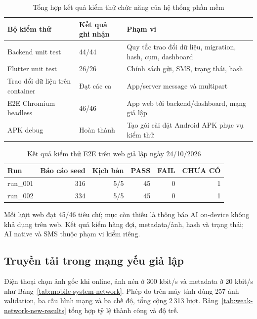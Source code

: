 \begin{table}[H]\centering\small
\caption{Tổng hợp kết quả kiểm thử chức năng của hệ thống phần mềm}
\label{tab:historical-tests}
\begin{tabularx}{\textwidth}{P{.32\textwidth}P{.16\textwidth}X}
\toprule Bộ kiểm thử & Kết quả ghi nhận & Phạm vi \\\midrule
Backend unit test & 44/44 & Quy tắc trao đổi dữ liệu, migration, hash, cụm, dashboard \\
Flutter unit test & 26/26 & Chính sách gửi, SMS, trạng thái, hash \\
Trao đổi dữ liệu trên container & Đạt các ca & App/server message và multipart \\
E2E Chromium headless & 46/46 & App web tới backend/dashboard, mạng giả lập \\
APK debug & Hoàn thành & Tạo gói cài đặt Android APK phục vụ kiểm thử \\
\bottomrule\end{tabularx}
\end{table}

\begin{table}[H]\centering\small
\caption{Kết quả kiểm thử E2E trên web giả lập ngày 24/10/2026}\label{tab:web-e2e-results}
\begin{tabular}{lrrrrr}
\toprule Run & Báo cáo seed & Kịch bản & PASS & FAIL & CHƯA CÓ \\
\midrule
run\_001 & 316 & 5/5 & 45 & 0 & 1 \\
run\_002 & 334 & 5/5 & 45 & 0 & 1 \\
\bottomrule
\end{tabular}
\end{table}
Mỗi lượt web đạt 45/46 tiêu chí; mục còn thiếu là thông báo AI on-device không khả dụng trên web. Kết quả kiểm hàng đợi, metadata/ảnh, hash và trạng thái; AI native và SMS thuộc phạm vi kiểm riêng.

\subsection{Truyền tải trong mạng yếu giả lập}\label{sec:weak-network-results}
Điện thoại chọn ảnh gốc khi online, ảnh nén ở 300 kbit/s và metadata ở 20 kbit/s như Bảng~\ref{tab:mobile-system-network}. Phép đo trên máy tính dùng 257 ảnh validation, ba cấu hình mạng và ba chế độ, tổng cộng 2\,313 lượt. Bảng~\ref{tab:weak-network-new-results} tổng hợp tỷ lệ thành công và độ trễ.

